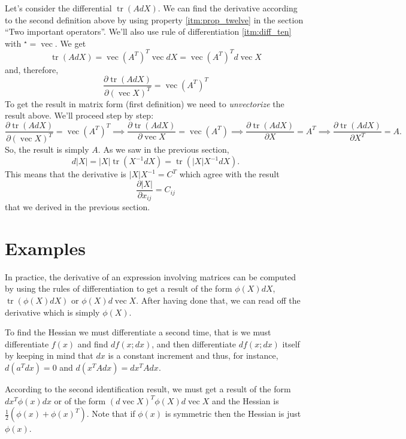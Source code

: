 \documentclass[a4paper,12pt]{article}
\begin{document}
Let's consider the differential $\operatorname{tr}(AdX)$. We can find the derivative according to the second definition above by using property \eqref{itm:prop_twelve} in the section ``Two important operators''. We'll also use rule of differentiation \eqref{itm:diff_ten} with $^\star = \operatorname{vec}$. We get
$$
\operatorname{tr}(AdX) = \operatorname{vec}(A^T)^T\operatorname{vec}dX = \operatorname{vec}(A^T)^T d\operatorname{vec}X
$$ and, therefore,
$$ \frac{\partial \operatorname{tr}(AdX)}{\partial (\operatorname{vec}X)^T} = \operatorname{vec}(A^T)^T
$$ To get the result in matrix form (first definition) we need to \emph{unvectorize} the result above. We'll proceed step by step:
$$ \frac{\partial \operatorname{tr}(AdX)}{\partial (\operatorname{vec}X)^T} = \operatorname{vec}(A^T)^T \implies
\frac{\partial \operatorname{tr}(AdX)}{\partial \operatorname{vec}X} = \operatorname{vec}(A^T) \implies
\frac{\partial \operatorname{tr}(AdX)}{\partial X} = A^T \implies
\frac{\partial \operatorname{tr}(AdX)}{\partial X^T} = A.
$$ So, the result is simply $A$. As we saw in the previous section,
$$ d|X| = |X|\operatorname{tr}(X^{-1}dX) = \operatorname{tr}(|X|X^{-1}dX).
$$ This means that the derivative is $|X|X^{-1} = C^T$ which agree with the result
$$ \frac{\partial|X|}{\partial x_{ij}} = C_{ij}
$$ that we derived in the previous section.

\section{Examples}

In practice, the derivative of an expression involving matrices can be computed by using the rules of differentiation to get a result of the form $\phi(X)dX$, $\operatorname{tr}(\phi(X)dX)$ or $\phi(X)d\operatorname{vec}X$. After having done that, we can read off the derivative which is simply $\phi(X)$.

To find the Hessian we must differentiate a second time, that is we must differentiate $f(x)$ and find $df(x;dx)$, and then differentiate $df(x;dx)$ itself by keeping in mind that $dx$ is a constant increment and thus, for instance, $d(a^Tdx) = 0$ and $d(x^TAdx) = dx^TAdx$.

According to the second identification result, we must get a result of the form $dx^T\phi(x)dx$ or of the form $(d\operatorname{vec}X)^T\phi(X)d\operatorname{vec}X$ and the Hessian is $\frac{1}{2}(\phi(x)+\phi(x)^T)$. Note that if $\phi(x)$ is symmetric then the Hessian is just $\phi(x)$.
\end{document}
